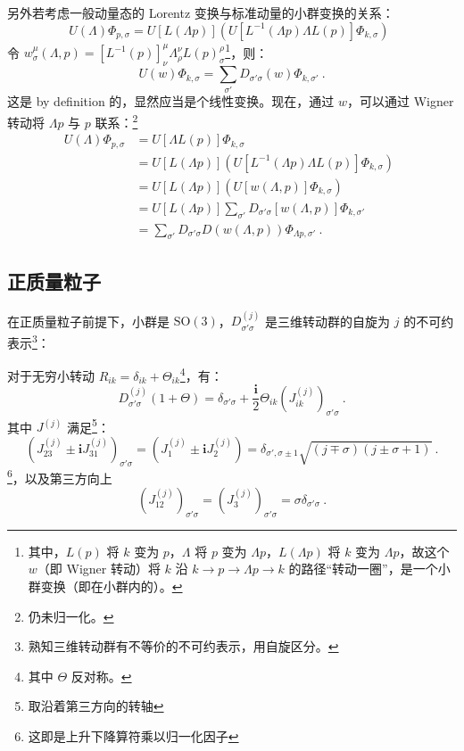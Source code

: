 另外若考虑一般动量态的 Lorentz 变换与标准动量的小群变换的关系：
\begin{equation}
	U(\Lambda) \Phi_{p, \sigma} = U[L(\Lambda p)] (U[L^{-1} (\Lambda p) \Lambda L(p)] \Phi_{k, \sigma}) ~~
\end{equation}
令 $w^\mu_\sigma(\Lambda, p) = [L^{-1}(p)]^\mu_\nu \Lambda^\nu_\rho L(p)^\rho_\sigma$\footnote{其中，$L(p)$ 将 $k$ 变为 $p$，$\Lambda$ 将 $p$ 变为 $\Lambda p$，$L(\Lambda p)$ 将 $k$ 变为 $\Lambda p$，故这个 $w$（即 Wigner 转动）将 $k$ 沿 $k \to p \to \Lambda p \to k$ 的路径“转动一圈”，是一个小群变换（即在小群内的）。}，则：
\begin{equation}
	U(w) \Phi_{k, \sigma} = \sum_{\sigma'} D_{\sigma' \sigma}(w) \Phi_{k, \sigma'} ~.
\end{equation}
这是 by definition 的，显然应当是个线性变换。现在，通过 $w$，可以通过 Wigner 转动将 $\Lambda p$ 与 $p$ 联系：\footnote{仍未归一化。}
\begin{equation}
	\begin{aligned}
		U(\Lambda) \Phi_{p, \sigma} 
		&= U[\Lambda L(p)] \Phi_{k, \sigma} \\
		&= U[L(\Lambda p)] (U[L^{-1}(\Lambda p) \Lambda L(p)] \Phi_{k, \sigma}) \\
		&= U[L(\Lambda p)] (U[w(\Lambda, p)] \Phi_{k, \sigma}) \\
		&= U[L(\Lambda p)] \sum_{\sigma '} D_{\sigma ' \sigma}[w(\Lambda, p)] \Phi_{k, \sigma'} \\
		&= \sum_{\sigma'} D_{\sigma' \sigma} D\left(w(\Lambda, p)\right) \Phi_{\Lambda p, \sigma'} ~.
	\end{aligned} ~~
\end{equation}

\subsection{正质量粒子}
在正质量粒子前提下，小群是 $\text{SO}(3)$，$D^{(j)}_{\sigma' \sigma}$ 是三维转动群的自旋为 $j$ 的不可约表示\footnote{熟知三维转动群有不等价的不可约表示，用自旋区分。}：

对于无穷小转动 $R_{ik} = \delta_{ik} + \Theta_{ik}$\footnote{其中 $\Theta$ 反对称。}，有：
\begin{equation}
	D_{\sigma' \sigma}^{(j)} (1+\Theta) = \delta_{\sigma' \sigma} + \frac{\mathbf{i}}{2} \Theta_{ik} \left(J_{ik}^{(j)}\right)_{\sigma' \sigma} ~.
\end{equation}
其中 $J^{(j)}$ 满足\footnote{取沿着第三方向的转轴}：
\begin{equation}
	\left(J^{(j)}_{23} \pm \mathbf{i} J_{31}^{(j)}\right)_{\sigma' \sigma} = \left(J_1^{(j)} \pm \mathbf{i} J_2^{(j)}\right) = \delta_{\sigma', \sigma \pm 1} \sqrt{(j \mp \sigma)(j \pm \sigma + 1)} ~.
\end{equation}
\footnote{这即是上升下降算符乘以归一化因子}，以及第三方向上
\begin{equation}
	\left(J_{12}^{(j)}\right)_{\sigma' \sigma} = \left(J^{(j)}_3\right)_{\sigma' \sigma} = \sigma \delta_{\sigma' \sigma} ~.
\end{equation}

